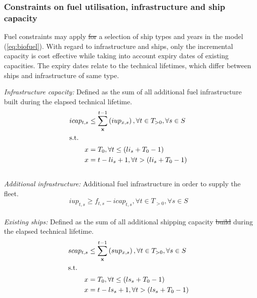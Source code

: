 \documentclass[article]{elsarticle}
\providecommand{\DIFaddtex}[1]{{\protect\color{blue}\uwave{#1}}} %
\providecommand{\DIFdeltex}[1]{{\protect\color{red}\sout{#1}}}                      %
\providecommand{\DIFaddbegin}{} %
\providecommand{\DIFaddend}{} %
\providecommand{\DIFdelbegin}{} %
\providecommand{\DIFdelend}{} %
\providecommand{\DIFadd}[1]{\texorpdfstring{\DIFaddtex{#1}}{#1}} %
\providecommand{\DIFdel}[1]{\texorpdfstring{\DIFdeltex{#1}}{}} %
\begin{document}
\subsubsection{Constraints on fuel utilisation, infrastructure and ship capacity}
Fuel constraints may apply \DIFdelbegin \DIFdel{for }\DIFdelend \DIFaddbegin \DIFadd{to }\DIFaddend a selection of ship types and years in the model (\autoref{eq:biofuel}). With regard to infrastructure and ships, only the incremental capacity is cost effective while taking into account \DIFaddbegin \DIFadd{the }\DIFaddend expiry dates of existing capacities. The expiry dates relate to the technical lifetimes, which differ between ships and infrastructure of same type.\\\par\noindent
\textit{Infrastructure capacity: }Defined as the sum of all additional fuel infrastructure built during the elapsed technical lifetime.
\begin{subequations}
    \begin{align}
        icap_{t,s} &\leq \sum_{\textbf{x}}^{t-1} \left( iup_{x,s} \right), \forall t \in T_{>0}, \forall s \in S\label{eq:icap}\\
        \intertext{s.t.}
        x &= T_0, \forall t \leq \left(li_{s} + T_0 - 1\right)\\
        x &= t - li_{s} + 1, \forall t > \left(li_{s} + T_0 - 1\right)
    \end{align}
\end{subequations}\\
\textit{Additional infrastructure: }Additional fuel infrastructure in order to supply the fleet.
\begin{equation}
    iup_{t,s} \geq f_{t,s} - icap_{t,s}, \forall t \in T_{>0}, \forall s \in S\label{eq:iup}
\end{equation}\\
\textit{Existing ships: }Defined as the sum of all additional shipping capacity \DIFdelbegin \DIFdel{build }\DIFdelend \DIFaddbegin \DIFadd{built }\DIFaddend during the elapsed technical lifetime.
\begin{subequations}
    \begin{align}
        scap_{t,s} &\leq \sum_{\textbf{x}}^{t-1} \left(sup_{x,s} \right), \forall t \in T_{>0}, \forall s \in S\label{eq:scap}\\
        \intertext{s.t.}
        x &= T_0, \forall t \leq \left(ls_{s} + T_0 - 1\right)\\
        x &= t - ls_{s} + 1, \forall t > \left(ls_{s} + T_0 - 1\right)
    \end{align}
\end{subequations}\\
\end{document}

